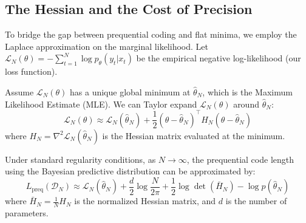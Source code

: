 \subsection{The Hessian and the Cost of Precision}

To bridge the gap between prequential coding and flat minima, we employ the Laplace approximation on the marginal likelihood. Let $\mathcal{L}_N(\theta) = -\sum_{t=1}^N \log p_\theta(y_t | x_t)$ be the empirical negative log-likelihood (our loss function).

Assume $\mathcal{L}_N(\theta)$ has a unique global minimum at $\hat{\theta}_N$, which is the Maximum Likelihood Estimate (MLE). We can Taylor expand $\mathcal{L}_N(\theta)$ around $\hat{\theta}_N$:
\begin{equation}
    \mathcal{L}_N(\theta) \approx \mathcal{L}_N(\hat{\theta}_N) + \frac{1}{2} (\theta - \hat{\theta}_N)^\top H_N (\theta - \hat{\theta}_N)
\end{equation}
where $H_N = \nabla^2 \mathcal{L}_N(\hat{\theta}_N)$ is the Hessian matrix evaluated at the minimum.

\begin{theorem}
\label{thm:preq_flatness}
Under standard regularity conditions, as $N \to \infty$, the prequential code length using the Bayesian predictive distribution can be approximated by:
\begin{equation}
    L_{\text{preq}}(\mathcal{D}_N) \approx \mathcal{L}_N(\hat{\theta}_N) + \frac{d}{2} \log \frac{N}{2\pi} + \frac{1}{2} \log \det (\bar{H}_N) - \log p(\hat{\theta}_N)
\end{equation}
where $\bar{H}_N = \frac{1}{N} H_N$ is the normalized Hessian matrix, and $d$ is the number of parameters.
\end{theorem}

